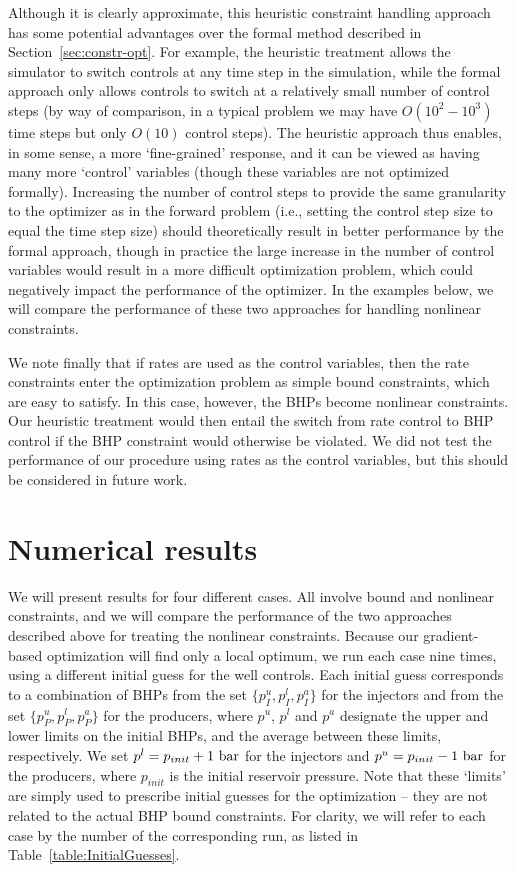 \documentclass[twocolumn,numbook]{svjour3}          %
\begin{document}
Although it is clearly approximate, this heuristic constraint handling approach
has some potential advantages over the formal method described in
Section~\ref{sec:constr-opt}. For example, the heuristic treatment allows the
simulator to switch controls at any time step in the simulation, while the
formal approach only allows controls to switch at a relatively small number of
control steps (by way of comparison, in a typical problem we may have
  $O(10^2-10^3)$ time steps but only $O(10)$ control steps). The heuristic
approach thus enables, in some sense, a more `fine-grained' response, and it can
be viewed as having many more `control' variables (though these variables are
  not optimized formally). Increasing the number of control steps to provide the
same granularity to the optimizer as in the forward problem (i.e., setting the
  control step size to equal the time step size) should theoretically result in
better performance by the formal approach, though in practice the large
increase in the number of control variables would result in a more difficult optimization
problem, which could negatively impact the performance of the optimizer. In the examples
below, we will compare the performance of these two approaches for handling
nonlinear constraints.

We note finally that if rates are used as the control variables, then the rate
constraints enter the optimization problem as simple bound constraints, which
are easy to satisfy. In this case, however, the BHPs become nonlinear
constraints. Our heuristic treatment would then entail the switch from rate
control to BHP control if the BHP constraint would otherwise be violated. We did
not test the performance of our procedure using rates as the control variables,
but this should be considered in future work.



\section{Numerical results}  \label{sec:results}

We will present results for four different cases. All involve bound and
nonlinear constraints, and we will compare the performance of the two approaches
described above for treating the nonlinear constraints. Because our
gradient-based optimization will find only a local optimum, we run each case
nine times, using a different initial guess for the well controls. Each initial
guess corresponds to a combination of BHPs from the set $\{p_I^u,p_I^l,p_I^a\}$
for the injectors and from the set $\{p_P^u,p_P^l,p_P^a\}$ for the producers,
where $p^u$, $p^l$ and $p^a$ designate the upper and lower limits on the
initial BHPs, and the average between these limits, respectively. We set
$p^l=p_{init}+1~{\rm bar}$ for the injectors and $p^u=p_{init}-1~{\rm bar}$
for the producers, where $p_{init}$ is the initial reservoir pressure. Note
that these `limits' are simply used to prescribe initial guesses for the
optimization -- they are not related to the actual BHP bound constraints.
For clarity, we will refer to each case by the number of the corresponding
run, as listed in Table~\ref{table:InitialGuesses}.
\end{document}
